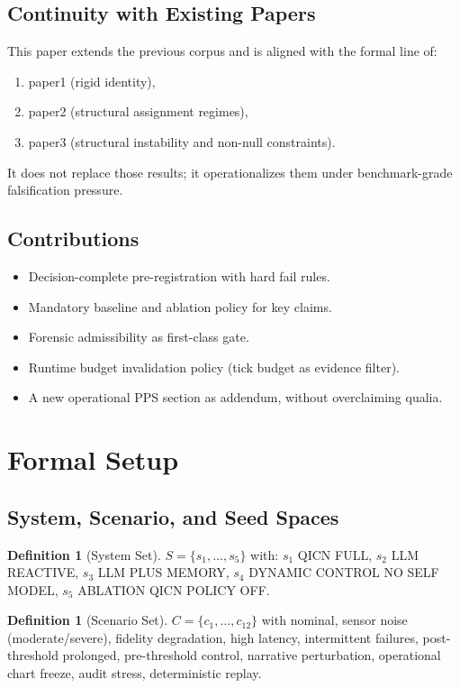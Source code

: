 \documentclass[11pt,a4paper]{article}
\theoremstyle{definition}
\newtheorem{definition}[theorem]{Definition}
\begin{document}
\subsection{Continuity with Existing Papers}
This paper extends the previous corpus and is aligned with the formal line of:
\begin{enumerate}
\item paper1 (rigid identity),
\item paper2 (structural assignment regimes),
\item paper3 (structural instability and non-null constraints).
\end{enumerate}
It does not replace those results; it operationalizes them under benchmark-grade falsification pressure.

\subsection{Contributions}
\begin{itemize}
\item Decision-complete pre-registration with hard fail rules.
\item Mandatory baseline and ablation policy for key claims.
\item Forensic admissibility as first-class gate.
\item Runtime budget invalidation policy (tick budget as evidence filter).
\item A new operational PPS section as addendum, without overclaiming qualia.
\end{itemize}

\section{Formal Setup}
\subsection{System, Scenario, and Seed Spaces}
\begin{definition}[System Set]
$S = \{s_1,\dots,s_5\}$ with:
$s_1$ QICN FULL,
$s_2$ LLM REACTIVE,
$s_3$ LLM PLUS MEMORY,
$s_4$ DYNAMIC CONTROL NO SELF MODEL,
$s_5$ ABLATION QICN POLICY OFF.
\end{definition}

\begin{definition}[Scenario Set]
$C = \{c_1,\dots,c_{12}\}$ with nominal, sensor noise (moderate/severe), fidelity degradation, high latency, intermittent failures, post-threshold prolonged, pre-threshold control, narrative perturbation, operational chart freeze, audit stress, deterministic replay.
\end{definition}
\end{document}
